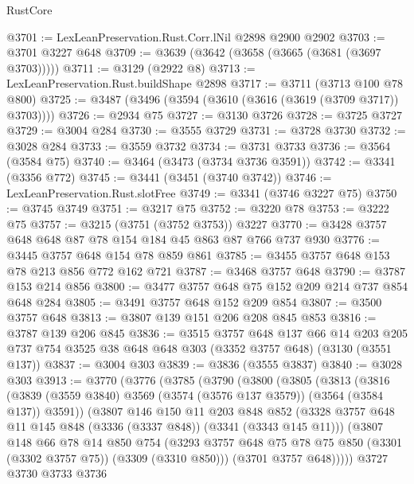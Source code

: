 \begin{lexlean}{RustCore}
\begin{coremodule}
@3701 := LexLeanPreservation.Rust.Corr.lNil @2898 @2900 @2902
@3703 := @3701 @3227 @648
@3709 := @3639 (@3642 (@3658 (@3665 (@3681 (@3697 @3703)))))
@3711 := @3129 (@2922 @8)
@3713 := LexLeanPreservation.Rust.buildShape @2898
@3717 := @3711 (@3713 @100 @78 @800)
@3725 := @3487 (@3496 (@3594 (@3610 (@3616 (@3619 (@3709 @3717)) @3703))))
@3726 := @2934 @75
@3727 := @3130 @3726
@3728 := @3725 @3727
@3729 := @3004 @284
@3730 := @3555 @3729
@3731 := @3728 @3730
@3732 := @3028 @284
@3733 := @3559 @3732
@3734 := @3731 @3733
@3736 := @3564 (@3584 @75)
@3740 := @3464 (@3473 (@3734 @3736 @3591))
@3742 := @3341 (@3356 @772)
@3745 := @3441 (@3451 (@3740 @3742))
@3746 := LexLeanPreservation.Rust.slotFree
@3749 := @3341 (@3746 @3227 @75)
@3750 := @3745 @3749
@3751 := @3217 @75
@3752 := @3220 @78
@3753 := @3222 @75
@3757 := @3215 (@3751 (@3752 @3753)) @3227
@3770 := @3428 @3757 @648 @648 @87 @78 @154 @184 @45 @863 @87 @766 @737 @930
@3776 := @3445 @3757 @648 @154 @78 @859 @861
@3785 := @3455 @3757 @648 @153 @78 @213 @856 @772 @162 @721
@3787 := @3468 @3757 @648
@3790 := @3787 @153 @214 @856
@3800 := @3477 @3757 @648 @75 @152 @209 @214 @737 @854 @648 @284
@3805 := @3491 @3757 @648 @152 @209 @854
@3807 := @3500 @3757 @648
@3813 := @3807 @139 @151 @206 @208 @845 @853
@3816 := @3787 @139 @206 @845
@3836 := @3515
    @3757
    @648
    @137
    @66
    @14
    @203
    @205
    @737
    @754
    @3525
    @38
    @648
    @648
    @303
    (@3352 @3757 @648)
    (@3130 (@3551 @137))
@3837 := @3004 @303
@3839 := @3836 (@3555 @3837)
@3840 := @3028 @303
@3913 := @3770
    (@3776
      (@3785
        (@3790
          (@3800
            (@3805
              (@3813
                (@3816
                  (@3839 (@3559 @3840) @3569 (@3574 (@3576 @137 @3579)) (@3564 (@3584 @137)) @3591))
                (@3807
                  @146
                  @150
                  @11
                  @203
                  @848
                  @852
                  (@3328 @3757 @648 @11 @145 @848 (@3336 (@3337 @848)) (@3341 (@3343 @145 @11)))
                  (@3807
                    @148
                    @66
                    @78
                    @14
                    @850
                    @754
                    (@3293
                      @3757
                      @648
                      @75
                      @78
                      @75
                      @850
                      (@3301 (@3302 @3757 @75))
                      (@3309 (@3310 @850)))
                    (@3701 @3757 @648)))))
            @3727
            @3730
            @3733
            @3736

\end{coremodule}
\end{lexlean}
